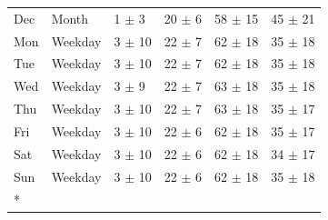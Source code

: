 \begin{longtable}[t]{llllll}
Dec & Month & 1 $\pm$ 3 & 20 $\pm$ 6 & 58 $\pm$ 15 & 45 $\pm$ 21\\
Mon & Weekday & 3 $\pm$ 10 & 22 $\pm$ 7 & 62 $\pm$ 18 & 35 $\pm$ 18\\
Tue & Weekday & 3 $\pm$ 10 & 22 $\pm$ 7 & 62 $\pm$ 18 & 35 $\pm$ 18\\
Wed & Weekday & 3 $\pm$ 9 & 22 $\pm$ 7 & 63 $\pm$ 18 & 35 $\pm$ 18\\
Thu & Weekday & 3 $\pm$ 10 & 22 $\pm$ 7 & 63 $\pm$ 18 & 35 $\pm$ 17\\
Fri & Weekday & 3 $\pm$ 10 & 22 $\pm$ 6 & 62 $\pm$ 18 & 35 $\pm$ 17\\
Sat & Weekday & 3 $\pm$ 10 & 22 $\pm$ 6 & 62 $\pm$ 18 & 34 $\pm$ 17\\
Sun & Weekday & 3 $\pm$ 10 & 22 $\pm$ 6 & 62 $\pm$ 18 & 35 $\pm$ 18\\*
\end{longtable}
\endgroup{}
